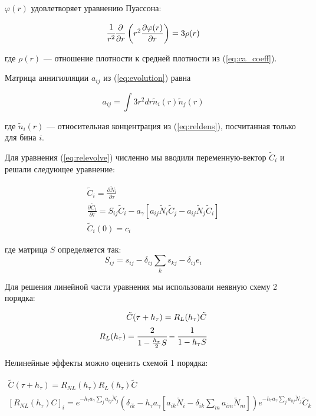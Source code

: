 \documentclass[a4paper, 14pt]{article}
\newcommand{\deriv}[2]{\frac{\partial #1}{\partial #2}}
\begin{document}
$\varphi(r)$ удовлетворяет уравнению Пуассона:

\begin{equation}
	\cfrac{1}{r^2}\deriv{}{r}
	\left(r^2\deriv{\varphi(r)}{r}\right) = 3\rho(r)
\end{equation}

где $\rho(r)$ --- отношение плотности к средней плотности из (\ref{eq:ca_coeff}).

Матрица аннигилляции $a_{ij}$ из (\ref{eq:evolution}) равна

\begin{equation}
	a_{ij} = \int{3r^2dr \tilde{n}_i(r)\tilde{n}_j(r)}
\end{equation}

где $\tilde{n}_i(r)$ --- относительная концентрация из (\ref{eq:reldens}), посчитанная только для бина $i$.


Для уравнения (\ref{eq:relevolve}) численно мы вводили переменную-вектор $\tilde{C}_{i}$ и решали следующее уравнение:

\begin{equation}
\begin{split}
	\tilde{C}_i = \deriv{\tilde{N}_i}{\tau} \\
	\deriv{\tilde{C}_i}{\tau} = S_{ij} \tilde{C}_{i} - a_{\gamma} [a_{ij} \tilde{N}_i \tilde{C}_{j} - a_{ij} \tilde{N}_j \tilde{C}_{i}] \\
	\tilde{C}_i(0) = c_i
\end{split}
\end{equation}

где матрица $S$ определяется так:
\begin{equation}
	S_{ij} = s_{ij} - \delta_{ij} \sum_{k}{s_{kj}} - \delta_{ij} e_{i}
\end{equation}

Для решения линейной части уравнения мы использовали неявную схему 2 порядка:

\begin{equation}
\begin{split}
	\tilde{C}(\tau + h_{\tau}) = R_L(h_{\tau}) \tilde{C} \\
	R_L(h_{\tau}) = \cfrac{2}{1 - \frac{h_{\tau}}{2}S} - \cfrac{1}{1 - h_{\tau}S}
\end{split}
\end{equation}

Нелинейные эффекты можно оценить схемой 1 порядка:

\begin{equation}
	\begin{split}
		\tilde{C}(\tau + h_{\tau}) = R_{NL}(h_{\tau}) R_L(h_{\tau}) \tilde{C} \\
		[R_{NL}(h_{\tau}) C]_i = e^{-h_{\tau} a_{\gamma} \sum_j{a_{ij}\tilde{N}_j} } (\delta_{ik} - h_{\tau} a_{\gamma} [a_{ik}\tilde{N}_i - \delta_{ik}\sum_{m}{a_{im}\tilde{N}_m}])
		e^{-h_{\tau} a_{\gamma} \sum_j{a_{kj}\tilde{N}_j} } \tilde{C}_k
	\end{split}
\end{equation}
\end{document}
